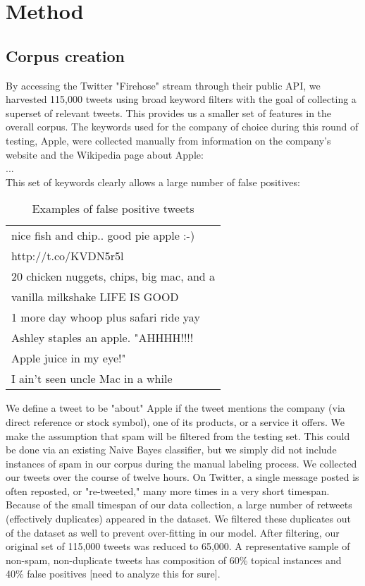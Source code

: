 \documentclass[letterpaper]{article}
\begin{document}
\section{Method}
\subsection{Corpus creation}
By accessing the Twitter "Firehose" stream through their public API, we harvested 115,000 tweets using broad keyword filters with the goal of collecting a superset of relevant tweets. This provides us a smaller set of features in the overall corpus. The keywords used for the company of choice during this round of testing, Apple, were collected manually from information on the company's website and the Wikipedia page about Apple:\\
...\\

This set of keywords clearly allows a large number of false positives:

\begin{table}[h]
\centering
\begin{tabular}{|l|}
	\hline
	nice fish and chip.. good pie apple :-) \\ http://t.co/KVDN5r5l \\ \hline
	20 chicken nuggets, chips, big mac, and a \\ vanilla milkshake LIFE IS GOOD \\ \hline
	1 more day whoop plus safari ride yay \\ \hline
	Ashley staples an apple.  "AHHHH!!!! \\ Apple juice in my eye!" \\ \hline
	I ain't seen uncle Mac in a while \\
	\hline
\end{tabular}
\caption{Examples of false positive tweets}
\label{tab:myfirsttable}
\end{table}


We define a tweet to be "about" Apple if the tweet mentions the company (via direct reference or stock symbol), one of its products, or a service it offers. We make the assumption that spam will be filtered from the testing set. This could be done via an existing Naive Bayes classifier, but we simply did not include instances of spam in our corpus during the manual labeling process. We collected our tweets over the course of twelve hours. On Twitter, a single message posted is often reposted, or "re-tweeted," many more times in a very short timespan. Because of the small timespan of our data collection, a large number of retweets (effectively duplicates) appeared in the dataset. We filtered these duplicates out of the dataset as well to prevent over-fitting in our model. After filtering, our original set of 115,000 tweets was reduced to 65,000. A representative sample of non-spam, non-duplicate tweets has composition of 60\% topical instances and 40\% false positives [need to analyze this for sure].
\end{document}
